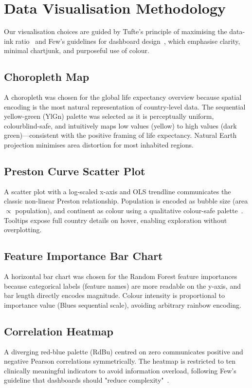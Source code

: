 \documentclass[conference]{IEEEtran}
\begin{document}
\section{Data Visualisation Methodology}

Our visualisation choices are guided by Tufte's principle of maximising the
data-ink ratio~\cite{tufte2001} and Few's guidelines for dashboard
design~\cite{few2006}, which emphasise clarity, minimal chartjunk, and
purposeful use of colour.

\subsection{Choropleth Map}
A choropleth was chosen for the global life expectancy overview because
spatial encoding is the most natural representation of country-level data.
The sequential yellow-green (YlGn) palette was selected as it is perceptually
uniform, colourblind-safe, and intuitively maps low values (yellow) to high
values (dark green)---consistent with the positive framing of life expectancy.
Natural Earth projection minimises area distortion for most inhabited regions.

\subsection{Preston Curve Scatter Plot}
A scatter plot with a log-scaled x-axis and OLS trendline communicates the
classic non-linear Preston relationship. Population is encoded as bubble size
(area $\propto$ population), and continent as colour using a qualitative
colour-safe palette~\cite{colorbrewer}. Tooltips expose full country details
on hover, enabling exploration without overplotting.

\subsection{Feature Importance Bar Chart}
A horizontal bar chart was chosen for the Random Forest feature importances
because categorical labels (feature names) are more readable on the y-axis,
and bar length directly encodes magnitude. Colour intensity is proportional
to importance value (Blues sequential scale), avoiding arbitrary rainbow
encoding.

\subsection{Correlation Heatmap}
A diverging red-blue palette (RdBu) centred on zero communicates positive
and negative Pearson correlations symmetrically. The heatmap is restricted to
ten clinically meaningful indicators to avoid information overload, following
Few's guideline that dashboards should "reduce complexity"~\cite{few2006}.
\end{document}
